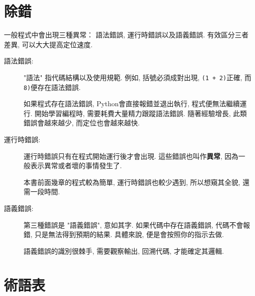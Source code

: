 \documentclass[10pt]{book}
\begin{document}
\section{除錯}

一般程式中會出現三種異常：
語法錯誤, 運行時錯誤以及語義錯誤. 
有效區分三者差異, 可以大大提高定位速度. 

\begin{description}

\item[語法錯誤:] "語法" 指代碼結構以及使用規範. 
例如, 括號必須成對出現, 
{\tt (1 + 2)}正確, 而{\tt 8)}便存在語法錯誤. 

如果程式存在語法錯誤, Python會直接報錯並退出執行, 
程式便無法繼續運行. 
開始學習編程時, 需要耗費大量精力跟蹤語法錯誤. 
隨著經驗增長, 此類錯誤會越來越少, 而定位也會越來越快. 


\item[運行時錯誤:] 運行時錯誤只有在程式開始運行後才會出現. 
這些錯誤也叫作{\bf 異常}, 因為一般表示異常或者壞的事情發生了. 
 
    

本書前面幾章的程式較為簡單, 運行時錯誤也較少遇到, 
所以想窺其全貌, 還需一段時間. 

\item[語義錯誤:] 第三種錯誤是 "語義錯誤", 意如其字. 
如果代碼中存在語義錯誤, 代碼不會報錯, 只是無法得到預期的結果. 
具體來說, 便是會按照你的指示去做. 
   

語義錯誤的識別很棘手, 需要觀察輸出, 回溯代碼, 才能確定其邏輯. 

\end{description}


\section{術語表}
\end{document}
